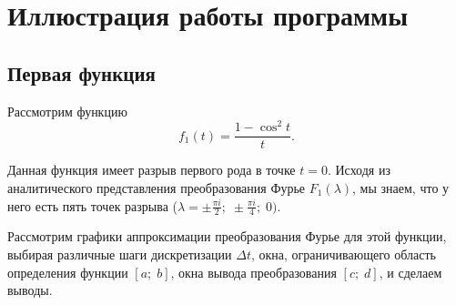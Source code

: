 \documentclass[a4paper, 11pt]{article}
\begin{document}
\section{Иллюстрация работы программы}
    \subsection{Первая функция}
    Рассмотрим функцию
    $$
        f_1(t) = \frac{1 - \cos^2t}{t}.    
    $$
    
    Данная функция имеет разрыв первого рода в точке $t = 0$. Исходя из аналитического представления преобразования Фурье $F_1(\lambda)$, мы знаем, что у него есть пять точек разрыва ($\lambda = \pm \frac{\pi i}{2}; \; \pm \frac{\pi i}{4};\; 0 )$.
    
    Рассмотрим графики аппроксимации преобразования Фурье для этой функции, выбирая различные шаги дискретизации $\Delta t$, окна, ограничивающего область определения функции $[a;\; b]$, окна вывода преобразования $[c;\; d]$, и сделаем выводы.
    
\end{document}

